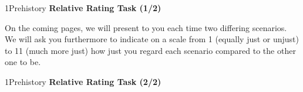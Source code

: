 \documentclass[xcolor=table,9pt,aspectratio=169]{beamer}
\begin{document}
\begin{frame}{\vspace*{10mm}1\hspace*{1em}Prehistory}
   \textbf{Relative Rating Task (1/2)}
   
   \medskip
   On the coming pages, we will present to you each time two differing scenarios.
   We will ask you furthermore to indicate on a scale from 1 (equally just or unjust) to 11 (much more just) how just you regard each scenario compared to the other one to be.
\end{frame}


\begin{frame}{\vspace*{10mm}1\hspace*{1em}Prehistory}
   \textbf{Relative Rating Task (2/2)}
   \begin{multicols}{2}
      \begin{center}
      \end{center}
   \end{multicols}
\end{frame}
\end{document}
